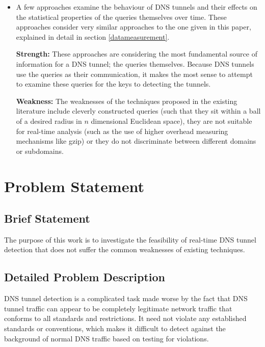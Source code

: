\documentclass[12pt]{report}
\theoremstyle{remark}
\theoremstyle{definition}
\theoremstyle{definition}
\theoremstyle{definition}
\begin{document}
\begin{itemize}
\item A few approaches examine the behaviour of DNS tunnels and their effects on
the statistical properties of the queries themselves over time. These approaches
consider very similar approaches to the one given in this paper, explained in
detail in section \ref{datameasurement}.

\textbf{Strength:} These approaches are considering the most fundamental source
of information for a DNS tunnel; the queries themselves. Because DNS tunnels use
the queries as their communication, it makes the most sense to attempt to
examine these queries for the keys to detecting the tunnels.

\textbf{Weakness:} The weaknesses of the techniques proposed in the existing
literature include cleverly constructed queries (such that they sit within a
ball of a desired radius in $n$ dimensional Euclidean space), they are not
suitable for real-time analysis (such as the use of higher overhead measuring
mechanisms like gzip) or they do not discriminate between different domains
or subdomains.
\end{itemize}

\newpage
\chapter{Problem Statement}

\section{Brief Statement}
\label{briefproblem}
The purpose of this work is to investigate the feasibility of real-time DNS tunnel detection that does not suffer the common weaknesses of existing techniques.

\section{Detailed Problem Description}
DNS tunnel detection is a complicated task made worse by the fact that DNS
tunnel traffic can appear to be completely legitimate network traffic that
conforms to all standards and restrictions. It
need not violate any established standards or conventions, which makes it
difficult to detect against the background of normal DNS traffic based on
testing for violations.
\end{document}
